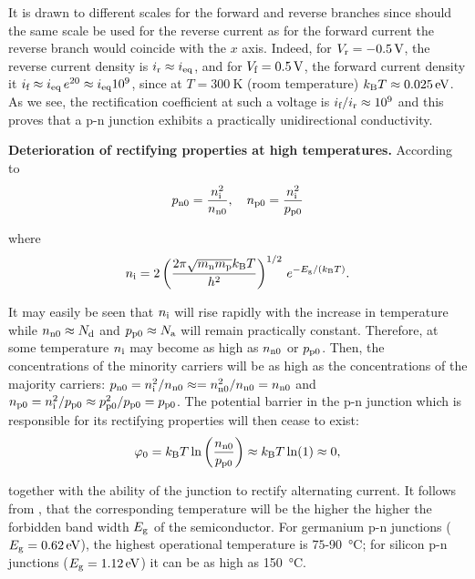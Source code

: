 It is drawn to different scales for the forward and reverse branches since should the same scale be used for the reverse current as for the forward current the reverse branch would coincide with the $x$ axis. Indeed, for $V_{\text{r}}=-\SI{0.5}{V}$, the reverse current density is $i_{\text{r}}\approx i_{\text{eq}}$, and for $V_{\text{f}}=\SI{0.5}{V}$, the forward current density it $i_{\text{f}}\approx i_{\text{eq}}\,e^{20}\approx i_{\text{eq}}\num{e9}$, since at $T=\SI{300}{\kelvin}$ (room temperature) $k_{\text{B}}T\approx\SI{0.025}{\electronvolt}$.
As we see, the rectification coefficient at such a voltage is $i_{\text{f}}/i_{\text{r}}\approx\num{e9}$ and this proves that a p-n junction exhibits a practically unidirectional conductivity.

\textbf{Deterioration of rectifying properties at high temperatures.} According to 
\begin{equation*}
	p_{\text{n$0$}} = \frac{n_{\text{i}}^2}{n_{\text{n$0$}}},\quad n_{\text{p$0$}} = \frac{n_{\text{i}}^2}{p_{\text{p$0$}}}
\end{equation*}

\noindent
where
\begin{equation*}
	n_{\text{i}} = 2 \left( \frac{2\pi\sqrt{m_{\text{n}}m_{\text{p}}} k_{\text{B}}T}{h^2} \right)^{1/2}\, e^{-E_{\text{g}}/(k_{\text{B}}T)}.
\end{equation*}

\noindent
It may easily be seen that $n_{\text{i}}$ will rise rapidly with the increase in temperature while $n_{\text{n$0$}}\approx N_{\text{d}}$ and $p_{\text{p$0$}}\approx N_{\text{a}}$ will remain practically constant. Therefore, at some temperature $n_{\text{i}}$ may become as high as $n_{\text{n$0$}}$ or $p_{\text{p$0$}}$.
Then, the concentrations of the minority carriers will be as high as the concentrations of the majority carriers: $p_{\text{n$0$}}=n_{\text{i}}^2/n_{\text{n$0$}}\approx=n_{\text{n$0$}}^2/n_{\text{n$0$}}=n_{\text{n$0$}}$ and $n_{\text{p$0$}}=n_{\text{i}}^2/p_{\text{p$0$}}\approx p_{\text{p$0$}}^2/p_{\text{p$0$}}=p_{\text{p$0$}}$.
The potential barrier in the p-n junction which is responsible for its rectifying properties will then cease to exist:
\begin{equation*}
	\varphi_0 = k_{\text{B}}T \ln\left( \frac{n_{\text{n$0$}}}{p_{\text{p$0$}}} \right) \approx k_{\text{B}}T \ln(1) \approx 0,
\end{equation*}

\noindent
together with the ability of the junction to rectify alternating current. It follows from , that the corresponding temperature will be the higher the higher the forbidden band width $E_{\text{g}}$ of the semiconductor. For germanium p-n junctions ($E_{\text{g}}=\SI{0.62}{\electronvolt}$), the highest operational temperature is $75$-\SI{90}{\degreeCelsius}; for silicon p-n junctions ($E_{\text{g}}=\SI{1.12}{\electronvolt}$) it can be as high as \SI{150}{\degreeCelsius}.

